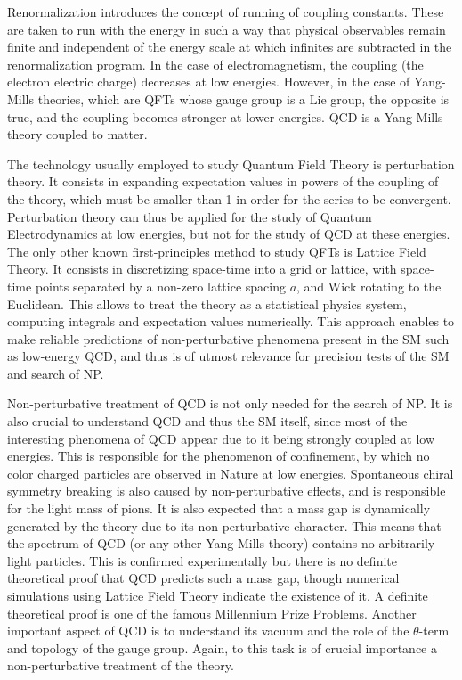 Renormalization introduces the concept of running of coupling constants. These are taken to run with the energy in such a way that physical observables remain finite and independent of the energy scale at which infinites are subtracted in the renormalization program.  In the case of electromagnetism, the coupling (the electron electric charge) decreases at low energies. However, in the case of Yang-Mills theories, which are QFTs whose gauge group is a Lie group, the opposite is true, and the coupling becomes stronger at lower energies. QCD is a Yang-Mills theory coupled to matter.

The technology usually employed to study Quantum Field Theory is perturbation theory. It consists in expanding expectation values in powers of the coupling of the theory, which must be smaller than 1 in order for the series to be convergent. Perturbation theory can thus be applied for the study of Quantum Electrodynamics at low energies, but not for the study of QCD at these energies. The only other known first-principles method to study QFTs is Lattice Field Theory. It consists in discretizing space-time into a grid or lattice, with space-time points separated by a non-zero lattice spacing $a$, and Wick rotating to the Euclidean. This allows to treat the theory as a statistical physics system, computing integrals and expectation values numerically. This approach enables to make reliable predictions of non-perturbative phenomena present in the SM such as low-energy QCD, and thus is of utmost relevance for precision tests of the SM and search of NP. 

Non-perturbative treatment of QCD is not only needed for the search of NP. It is also crucial to understand QCD and thus the SM itself, since most of the interesting phenomena of QCD appear due to it being strongly coupled at low energies. This is responsible for the phenomenon of confinement, by which no color charged particles are observed in Nature at low energies. Spontaneous chiral symmetry breaking is also caused by non-perturbative effects, and is responsible for the light mass of pions. It is also expected that a mass gap is dynamically generated by the theory due to its non-perturbative character. This means that the spectrum of QCD (or any other Yang-Mills theory) contains no arbitrarily light particles. This is confirmed experimentally but there is no definite theoretical proof that QCD predicts such a mass gap, though numerical simulations using Lattice Field Theory indicate the existence of it. A definite theoretical proof is one of the famous Millennium Prize Problems. Another important aspect of QCD is to understand its vacuum and the role of the $\theta$-term and topology of the gauge group. Again, to this task is of crucial importance a non-perturbative treatment of the theory.

